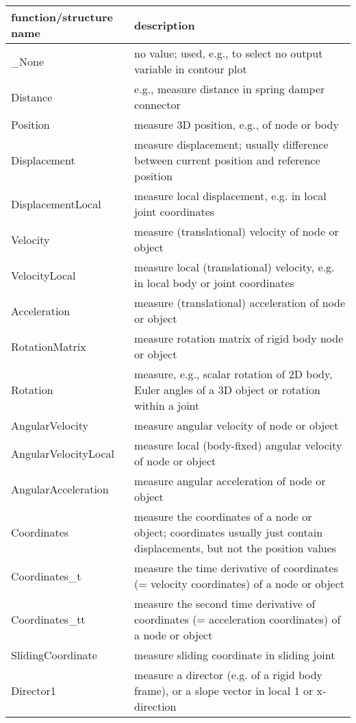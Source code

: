 \begin{center}
\footnotesize
\begin{longtable}{| p{8cm} | p{8cm} |} 
\hline
{\bf function/structure name} & {\bf description}\\ \hline
  \_None & no value; used, e.g., to select no output variable in contour plot\\ \hline  
  Distance & e.g., measure distance in spring damper connector\\ \hline  
  Position & measure 3D position, e.g., of node or body\\ \hline  
  Displacement & measure displacement; usually difference between current position and reference position\\ \hline  
  DisplacementLocal & measure local displacement, e.g. in local joint coordinates\\ \hline  
  Velocity & measure (translational) velocity of node or object\\ \hline  
  VelocityLocal & measure local (translational) velocity, e.g. in local body or joint coordinates\\ \hline  
  Acceleration & measure (translational) acceleration of node or object\\ \hline  
  RotationMatrix & measure rotation matrix of rigid body node or object\\ \hline  
  Rotation & measure, e.g., scalar rotation of 2D body, Euler angles of a 3D object or rotation within a joint\\ \hline  
  AngularVelocity & measure angular velocity of node or object\\ \hline  
  AngularVelocityLocal & measure local (body-fixed) angular velocity of node or object\\ \hline  
  AngularAcceleration & measure angular acceleration of node or object\\ \hline  
  Coordinates & measure the coordinates of a node or object; coordinates usually just contain displacements, but not the position values\\ \hline  
  Coordinates\_t & measure the time derivative of coordinates (= velocity coordinates) of a node or object\\ \hline  
  Coordinates\_tt & measure the second time derivative of coordinates (= acceleration coordinates) of a node or object\\ \hline  
  SlidingCoordinate & measure sliding coordinate in sliding joint\\ \hline  
  Director1 & measure a director (e.g. of a rigid body frame), or a slope vector in local 1 or x-direction\\ \hline  

\end{longtable}
\end{center}
